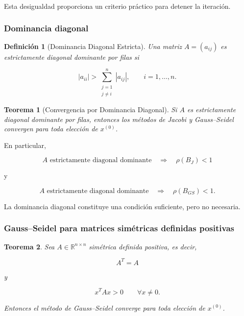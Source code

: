 \documentclass[12pt]{article}
\newtheorem{teorema}{Teorema}
\newtheorem{definicion}{Definición}
\begin{document}
Esta desigualdad proporciona un criterio práctico para detener la
iteración.


\subsubsection*{Dominancia diagonal}

\begin{definicion}[Dominancia Diagonal Estricta]
Una matriz $A=(a_{ij})$ es \emph{estrictamente diagonal dominante por
filas} si

\[
    \boxed{
    |a_{ii}|
    >
    \sum_{\substack{j=1\\j\neq i}}^{n}
    |a_{ij}|,
    \qquad
    i=1,\ldots,n.
    }
\]
\end{definicion}

\begin{teorema}[Convergencia por Dominancia Diagonal]
Si $A$ es estrictamente diagonal dominante por filas, entonces los
métodos de Jacobi y Gauss--Seidel convergen para toda elección de
$x^{(0)}$.
\end{teorema}

En particular,

\[
    A
    \text{ estrictamente diagonal dominante}
    \quad\Longrightarrow\quad
    \rho(B_J)<1
\]

y

\[
    A
    \text{ estrictamente diagonal dominante}
    \quad\Longrightarrow\quad
    \rho(B_{GS})<1.
\]

La dominancia diagonal constituye una condición suficiente, pero no
necesaria.


\subsubsection*{Gauss--Seidel para matrices simétricas definidas positivas}

\begin{teorema}
Sea $A\in\mathbb{R}^{n\times n}$ simétrica definida positiva, es decir,

\[
    A^T=A
\]

y

\[
    x^TAx>0
    \qquad
    \forall x\neq0.
\]

Entonces el método de Gauss--Seidel converge para toda elección de
$x^{(0)}$.
\end{teorema}
\end{document}
